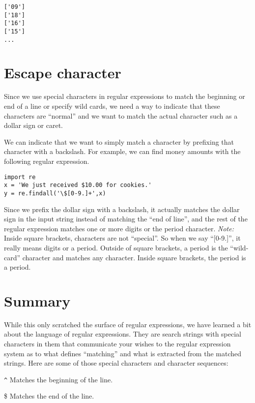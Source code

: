 \beforeverb
\begin{verbatim}
['09']
['18']
['16']
['15']
...
\end{verbatim}
\afterverb
%
\section{Escape character}

Since we use special characters in regular expressions to match the beginning or end of 
a line or specify wild cards, we need a way to indicate that these characters are ``normal'' 
and we want to match the actual character such as a dollar sign or caret.

We can indicate that we want to simply match a character by prefixing that character 
with a backslash.  For example, we can find money amounts with the following regular
expression.

\beforeverb
\begin{verbatim}
import re
x = 'We just received $10.00 for cookies.'
y = re.findall('\$[0-9.]+',x)
\end{verbatim}
\afterverb
%
Since we prefix the dollar sign with a backslash, it actually matches the dollar sign
in the input string instead of matching the ``end of line'', and the rest of the regular
expression matches one or more digits or the period character.  {\em Note:} Inside 
square brackets, characters are not ``special''.   So when we say ``[0-9.]'', it really 
means digits or a period.    Outside of square brackets, a period is the ``wild-card'' 
character and matches any character.  Inside square brackets, the period is a period.

\section{Summary}

While this only scratched the surface of regular expressions, we have learned a bit about
the language of regular expressions.  They are search strings with special characters in them
that communicate your wishes to the regular expression system as to what defines ``matching''
and what is extracted from the matched strings.  Here are some of those special characters
and character sequences:

\verb"^" \newline
Matches the beginning of the line.

\$ \newline
Matches the end of the line.

